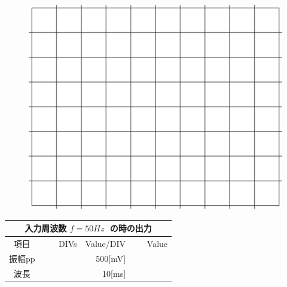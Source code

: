 \documentclass[uplatex,a4paper,11pt,oneside,openany]{jsbook}
\begin{document}
\begin{multicols}{2}
  \begin{figure}[H]
     \centering
      \includegraphics[keepaspectratio, scale=0.28, angle=0]
                  {figs/eps/grid.eps}
                  \label{fig:grid30mV}
  \end{figure}

  \begin{spacing}{1.5}
  \begin{tabular}{|c||r|r|r|}
    \multicolumn{4}{c}{入力周波数 $f=50Hz\;$ の時の出力} \\ \hline
    項目 & DIVs & Value/DIV & Value \\ \hline \hline
    振幅pp & 　　　　 & 500[mV]& 　　　　 \\ \hline
    波長 & 　　　　 & 10[ms]& 　　　　 \\ \hline
  \end{tabular}
\end{spacing}
\end{multicols}

\vfill
\end{document}
